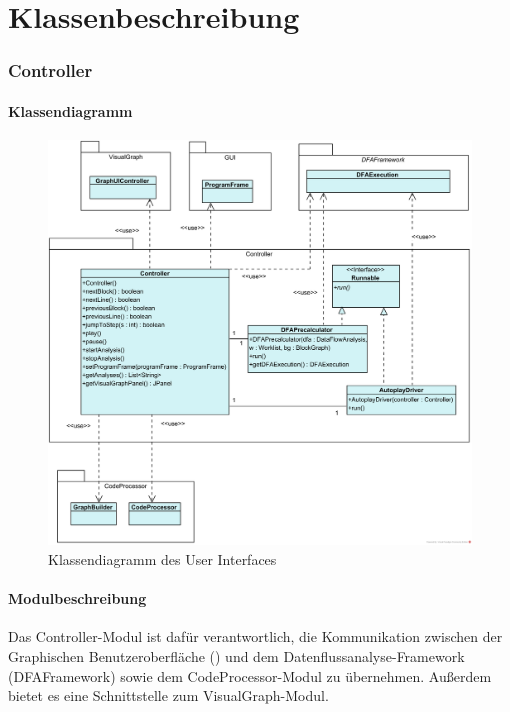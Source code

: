 
\part{Klassenbeschreibung}

\section{Controller}

\subsection{Klassendiagramm}

\begin{figure}[htbp] 
  \centering
  		 \includegraphics[width=1\textwidth]{Klassenuebersicht/Controller/Controller}
  \caption{Klassendiagramm des User Interfaces}
  \label{fig:UI}
\end{figure}

\subsection{Modulbeschreibung}

Das Controller-Modul ist dafür verantwortlich, die Kommunikation zwischen der Graphischen Benutzeroberfläche () und dem Datenflussanalyse-Framework (DFAFramework) sowie dem CodeProcessor-Modul zu übernehmen.
Außerdem bietet es eine Schnittstelle zum VisualGraph-Modul.


